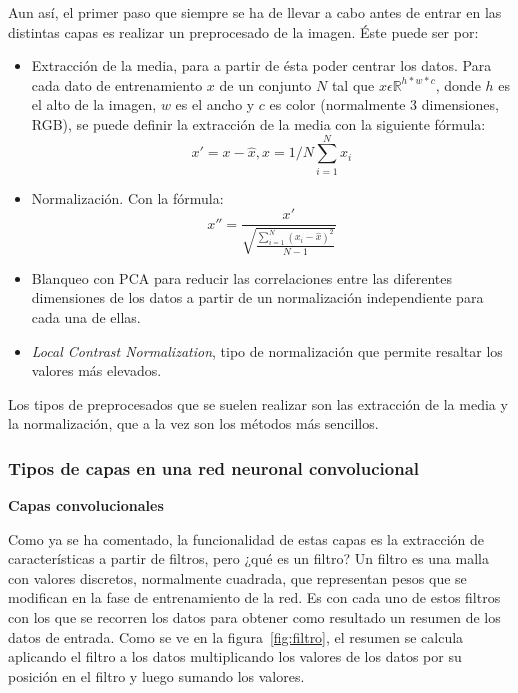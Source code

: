 Aun así, el primer paso que siempre se ha de llevar a cabo antes de entrar en las distintas capas es realizar un preprocesado de la imagen. Éste puede ser por:
\begin{itemize}
	\item Extracción de la media, para a partir de ésta poder centrar los datos. Para cada dato de entrenamiento $x$ de un conjunto $N$ tal que $x \epsilon \mathbb{R}^{h*w*c}$, donde $h$ es el alto de la imagen, $w$ es el ancho y $c$ es color (normalmente 3 dimensiones, RGB), se puede definir la extracción de la media con la siguiente fórmula:
	\begin{equation}
	x'=x-\widehat{x}, \widehat{x}=1/N\sum_{i=1}^{N}x_i
	\end{equation}
	\item Normalización. Con la fórmula:
	\begin{equation}
	x''=\frac{x'}{\sqrt{\frac{\sum_{i=1}^{N}(x_i-\widehat{x})^2}{N-1}}}
	\end{equation}
	\item Blanqueo con PCA para reducir las correlaciones entre las diferentes dimensiones de los datos a partir de un normalización independiente para cada una de ellas.
	\item \textit{Local Contrast Normalization}, tipo de normalización que permite resaltar los valores más elevados.
\end{itemize}

Los tipos de preprocesados que se suelen realizar son las extracción de la media y la normalización, que a la vez son los métodos más sencillos.

\subsubsection{Tipos de capas en una red neuronal convolucional}
\textbf{Capas convolucionales}

Como ya se ha comentado, la funcionalidad de estas capas es la extracción de características a partir de filtros, pero ¿qué es un filtro? Un filtro es una malla con valores discretos, normalmente cuadrada, que representan pesos que se modifican en la fase de entrenamiento de la red. Es con cada uno de estos filtros con los que se recorren los datos para obtener como resultado un resumen de los datos de entrada. Como se ve en la figura~\ref{fig:filtro}, el resumen se calcula aplicando el filtro a los datos multiplicando los valores de los datos por su posición en el filtro y luego sumando los valores.

